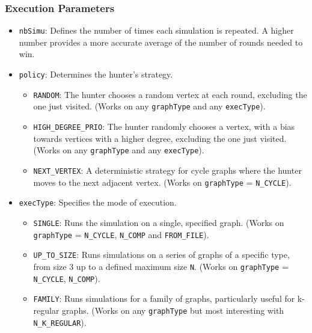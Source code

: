 \documentclass{article}
\begin{document}
\subsubsection{Execution Parameters}
\begin{itemize}
    \item \texttt{nbSimu}: Defines the number of times each simulation is
    repeated. A higher number provides a more accurate average of the number of 
    rounds needed to win.
    \item \texttt{policy}: Determines the hunter's strategy.
    \begin{itemize}
        \item \texttt{RANDOM}: The hunter chooses a random vertex at each round,
        excluding the one just visited. (Works on any \texttt{graphType} and
        any \texttt{execType}).
        \item \texttt{HIGH\_DEGREE\_PRIO}: The hunter randomly chooses a vertex,
        with a bias towards vertices with a higher degree, excluding the one
        just visited. (Works on any \texttt{graphType} and any
        \texttt{execType}).
        \item \texttt{NEXT\_VERTEX}: A deterministic strategy for cycle graphs
        where the hunter moves to the next adjacent vertex. (Works on
        \texttt{graphType} = \texttt{N\_CYCLE}).
    \end{itemize}
    \item \texttt{execType}: Specifies the mode of execution.
    \begin{itemize}
        \item \texttt{SINGLE}: Runs the simulation on a single, specified graph.
        (Works on \texttt{graphType} = \texttt{N\_CYCLE}, \texttt{N\_COMP} and
        \texttt{FROM\_FILE}).
        \item \texttt{UP\_TO\_SIZE}: Runs simulations on a series of graphs of
        a specific type, from size 3 up to a defined maximum size \texttt{N}.
        (Works on \texttt{graphType} = \texttt{N\_CYCLE}, \texttt{N\_COMP}).
        \item \texttt{FAMILY}: Runs simulations for a family of graphs,
        particularly useful for k-regular graphs. (Works on any
        \texttt{graphType} but most interesting with \texttt{N\_K\_REGULAR}).
    \end{itemize}
\end{itemize}
\end{document}
